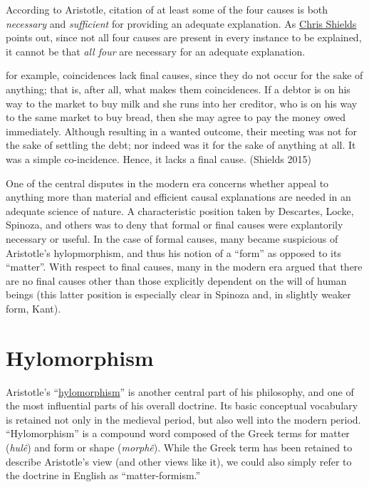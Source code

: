 \documentclass[12pt]{article}
\makeatletter
\newcommand{\citeprocitem}[2]{\hyper@linkstart{cite}{citeproc_bib_item_#1}#2\hyper@linkend}
\makeatother
\begin{document}
According to Aristotle, citation of at least some of the four causes is both
\emph{necessary} and \emph{sufficient} for providing an adequate explanation. As \href{http://plato.stanford.edu/entries/aristotle/\#FouCauAccExpAde}{Chris Shields}
points out, since not all four causes are present in every instance to be explained,
it cannot be that \emph{all four} are necessary for an adequate explanation.

\begin{quote-b}
for example, coincidences lack final causes, since they do not occur for the sake
of anything; that is, after all, what makes them coincidences. If a debtor is on
his way to the market to buy milk and she runs into her creditor, who is on his way
to the same market to buy bread, then she may agree to pay the money owed
immediately. Although resulting in a wanted outcome, their meeting was not for the
sake of settling the debt; nor indeed was it for the sake of anything at all. It
was a simple co-incidence. Hence, it lacks a final cause. (\citeprocitem{6}{Shields 2015})
\end{quote-b}

One of the central disputes in the modern era concerns whether appeal to anything
more than material and efficient causal explanations are needed in an adequate
science of nature. A characteristic position taken by Descartes, Locke, Spinoza, and
others was to deny that formal or final causes were explantorily necessary or useful.
In the case of formal causes, many became suspicious of Aristotle's hylopmorphism,
and thus his notion of a ``form'' as opposed to its ``matter''. With respect to final
causes, many in the modern era argued that there are no final causes other than those
explicitly dependent on the will of human beings (this latter position is especially
clear in Spinoza and, in slightly weaker form, Kant).

\section{Hylomorphism}
\label{sec:orgfcd7bdc}
Aristotle's ``\href{http://plato.stanford.edu/entries/aristotle/\#Hyl}{hylomorphism}'' is another central part of his philosophy, and one of the
most influential parts of his overall doctrine. Its basic conceptual vocabulary is
retained not only in the medieval period, but also well into the modern period.
``Hylomorphism'' is a compound word composed of the Greek terms for matter (\emph{hulê}) and
form or shape (\emph{morphê}). While the Greek term has been retained to describe
Aristotle's view (and other views like it), we could also simply refer to the
doctrine in English as ``matter-formism.''
\end{document}
